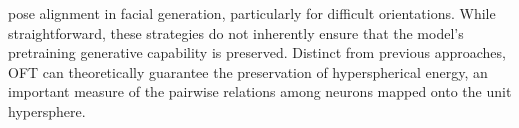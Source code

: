 pose alignment in facial generation, particularly for difficult orientations. While straightforward, these strategies do not inherently ensure that the model’s pretraining generative capability is preserved. Distinct from previous approaches, OFT can theoretically guarantee the preservation of hyperspherical energy, an important measure of the pairwise relations among neurons mapped onto the unit hypersphere.